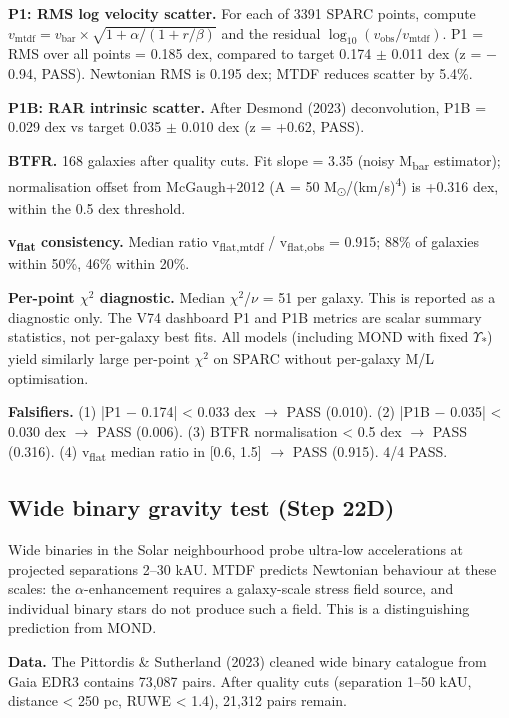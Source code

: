 \documentclass[11pt,a4paper]{article}
\begin{document}
\textbf{P1: RMS log velocity scatter.} For each of 3391 SPARC points, compute \(v_{\mathrm{mtdf}} = v_{\mathrm{bar}} \times \sqrt{1 + \alpha/(1 + r/\beta)}\) and the residual \(\log_{10}(v_{\mathrm{obs}}/v_{\mathrm{mtdf}})\). P1 = RMS over all points = 0.185 dex, compared to target 0.174 $\pm$ 0.011 dex (z = $-$0.94, PASS). Newtonian RMS is 0.195 dex; MTDF reduces scatter by 5.4\%.

\textbf{P1B: RAR intrinsic scatter.} After Desmond (2023) deconvolution, P1B = 0.029 dex vs target 0.035 $\pm$ 0.010 dex (z = +0.62, PASS).

\textbf{BTFR.} 168 galaxies after quality cuts. Fit slope = 3.35 (noisy M\textsubscript{bar} estimator); normalisation offset from McGaugh+2012 (A = 50 M\textsubscript{$\odot$}/(km/\allowbreak{}s)\textsuperscript{4}) is +0.316 dex, within the 0.5 dex threshold.

\textbf{v\textsubscript{flat} consistency.} Median ratio v\textsubscript{flat,mtdf} / v\textsubscript{flat,obs} = 0.915; 88\% of galaxies within 50\%, 46\% within 20\%.

\textbf{Per-point $\chi$$^{2}$ diagnostic.} Median $\chi$$^{2}$/$\nu$ = 51 per galaxy. This is reported as a diagnostic only. The V74 dashboard P1 and P1B metrics are scalar summary statistics, not per-galaxy best fits. All models (including MOND with fixed $\Upsilon$\textsubscript{*}) yield similarly large per-point $\chi$$^{2}$ on SPARC without per-galaxy M/\allowbreak{}L optimisation.

\textbf{Falsifiers.} (1) |P1 $-$ 0.174| < 0.033 dex $\rightarrow$ PASS (0.010). (2) |P1B $-$ 0.035| < 0.030 dex $\rightarrow$ PASS (0.006). (3) BTFR normalisation < 0.5 dex $\rightarrow$ PASS (0.316). (4) v\textsubscript{flat} median ratio in [0.6, 1.5] $\rightarrow$ PASS (0.915). 4/\allowbreak{}4 PASS.

\subsection{Wide binary gravity test (Step 22D)}
Wide binaries in the Solar neighbourhood probe ultra-low accelerations at projected separations 2--30 kAU. MTDF predicts Newtonian behaviour at these scales: the $\alpha$-enhancement requires a galaxy-scale stress field source, and individual binary stars do not produce such a field. This is a distinguishing prediction from MOND.

\textbf{Data.} The Pittordis \& Sutherland (2023) cleaned wide binary catalogue from Gaia EDR3 contains 73,087 pairs. After quality cuts (separation 1--50 kAU, distance < 250 pc, RUWE < 1.4), 21,312 pairs remain.
\end{document}
